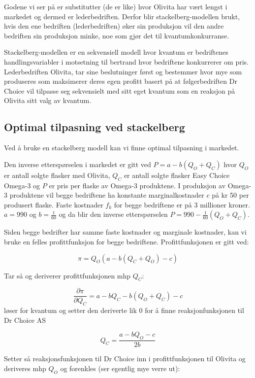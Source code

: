 \documentclass[
  12pt,
  a4paper,
  DIV=11,
  numbers=noendperiod]{scrartcl}
\begin{document}
Godene vi ser på er substitutter (de er like) hvor Olivita har vært
lengst i markedet og dermed er lederbedriften. Derfor blir
stackelberg-modellen brukt, hvis den ene bedriften (lederbedriften) øker
sin produksjon vil den andre bedriften sin produksjon minke, noe som
gjør det til kvantumkonkurranse.

Stackelberg-modellen er en sekvensiell modell hvor kvantum er
bedriftenes handlingsvariabler i motsetning til bertrand hvor bedriftene
konkurrerer om pris. Lederbedriften Olivita, tar sine beslutninger først
og bestemmer hvor mye som produseres som maksimerer deres egen profitt
basert på at følgerbedriften Dr Choice vil tilpasse seg sekvensielt med
sitt eget kvantum som en reaksjon på Olivita sitt valg av kvantum.

\subsection{Optimal tilpasning ved
stackelberg}\label{optimal-tilpasning-ved-stackelberg}

Ved å bruke en stackelberg modell kan vi finne optimal tilpasning i
markedet.

Den inverse etterspørselen i markedet er gitt ved \(P = a−b(Q_O+Q_C)\)
hvor \(Q_O\) er antall solgte flasker med Olivita, \(Q_C\) er antall
solgte flasker Easy Choice Omega-3 og \(P\) er pris per flaske av
Omega-3 produktene. I produksjon av Omega-3 produktene vil begge
bedriftene ha konstante marginalkostnader \(c\) på kr 50 per produsert
flaske. Faste kostnader \(f_k\) for begge bedriftene er på 3 millioner
kroner. \(a = 990\) og \(b = \frac{1}{60}\) og da blir den inverse
etterspørselen \(P = 990−\frac{1}{60}(Q_O+Q_C)\).

Siden begge bedrifter har samme faste kostnader og marginale kostnader,
kan vi bruke en felles profittfunksjon for begge bedriftene.
Profittfunksjonen er gitt ved:

\[\pi = Q_O(a-b(Q_C+Q_O)-c) \tag{1}\]

Tar så og deriverer profittfunksjonen mhp \(Q_C\):

\[\frac{\partial \pi}{\partial Q_C} = a -b Q_C - b(Q_O+Q_C) -c \tag{2}\]
løser for kvantum og setter den deriverte lik 0 for å finne
reaksjonfunksjonen til Dr Choice AS

\[ Q_C = \frac{a-b Q_O -c}{2b} \tag{3}\]

Setter så reaksjonsfunksjonen til Dr Choice inn i profittfunksjonen til
Olivita og deriveres mhp \(Q_O\) og forenkles (ser egentlig mye verre
ut):
\end{document}
